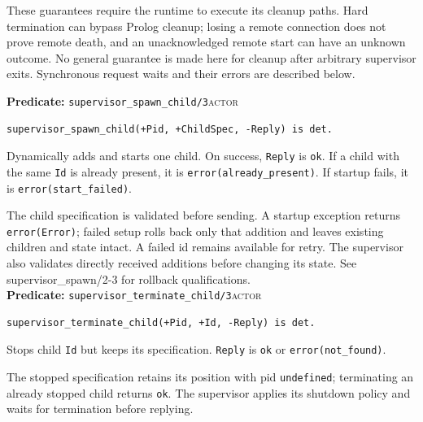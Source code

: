 These guarantees require the runtime to execute its cleanup paths. Hard termination can
bypass Prolog cleanup; losing a remote connection does not prove remote death, and an unacknowledged
remote start can have an unknown outcome. No general guarantee is made here for cleanup after
arbitrary supervisor exits. Synchronous request waits and their errors are described below.


\noindent \textbf{Predicate:} \texttt{supervisor\_\allowbreak{}spawn\_\allowbreak{}child/\allowbreak{}3}\hfill\textsc{actor}

\begin{verbatim}
supervisor_spawn_child(+Pid, +ChildSpec, -Reply) is det.
\end{verbatim}

Dynamically adds and starts one child. On success, \texttt{Reply} is \texttt{ok}. If a child with
the same \texttt{Id} is already present, it is \texttt{error(\allowbreak{}already\_\allowbreak{}present)}. If startup fails,
it is \texttt{error(\allowbreak{}start\_\allowbreak{}failed)}.

The child specification is validated before sending. A startup exception
returns \texttt{error(\allowbreak{}Error)}; failed setup rolls back only that addition and leaves existing
children and state intact. A failed id remains available for retry. The supervisor also
validates directly received additions before changing its state. See supervisor\_spawn/2-3 for rollback qualifications.\\




\noindent \textbf{Predicate:} \texttt{supervisor\_\allowbreak{}terminate\_\allowbreak{}child/\allowbreak{}3}\hfill\textsc{actor}

\begin{verbatim}
supervisor_terminate_child(+Pid, +Id, -Reply) is det.
\end{verbatim}

Stops child \texttt{Id} but keeps its specification. \texttt{Reply} is \texttt{ok} or
\texttt{error(\allowbreak{}not\_\allowbreak{}found)}.

The stopped specification retains its position with pid \texttt{undefined}; terminating an already
stopped child returns \texttt{ok}. The supervisor applies its shutdown policy and waits for
termination before replying.\\




